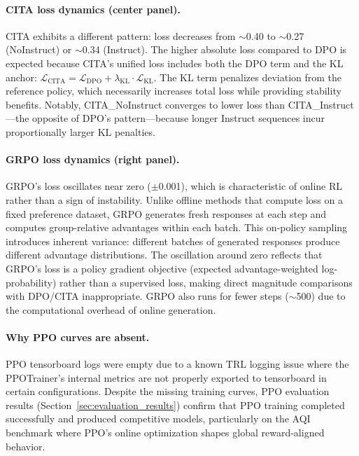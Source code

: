 \paragraph{\textsc{CITA} loss dynamics (center panel).}
\textsc{CITA} exhibits a different pattern: loss decreases from $\sim$0.40 to $\sim$0.27 (NoInstruct) or $\sim$0.34 (Instruct).
The higher absolute loss compared to DPO is expected because \textsc{CITA}'s unified loss includes both the DPO term and the KL anchor: $\mathcal{L}_{\text{CITA}} = \mathcal{L}_{\text{DPO}} + \lambda_{\text{KL}} \cdot \mathcal{L}_{\text{KL}}$.
The KL term penalizes deviation from the reference policy, which necessarily increases total loss while providing stability benefits.
Notably, \textsc{CITA}\_NoInstruct converges to lower loss than \textsc{CITA}\_Instruct---the opposite of DPO's pattern---because longer Instruct sequences incur proportionally larger KL penalties.

\paragraph{GRPO loss dynamics (right panel).}
GRPO's loss oscillates near zero ($\pm$0.001), which is characteristic of online RL rather than a sign of instability.
Unlike offline methods that compute loss on a fixed preference dataset, GRPO generates fresh responses at each step and computes group-relative advantages within each batch.
This on-policy sampling introduces inherent variance: different batches of generated responses produce different advantage distributions.
The oscillation around zero reflects that GRPO's loss is a policy gradient objective (expected advantage-weighted log-probability) rather than a supervised loss, making direct magnitude comparisons with DPO/\textsc{CITA} inappropriate.
GRPO also runs for fewer steps ($\sim$500) due to the computational overhead of online generation.

\paragraph{Why PPO curves are absent.}
PPO tensorboard logs were empty due to a known TRL logging issue where the PPOTrainer's internal metrics are not properly exported to tensorboard in certain configurations.
Despite the missing training curves, PPO evaluation results (Section~\ref{sec:evaluation_results}) confirm that PPO training completed successfully and produced competitive models, particularly on the AQI benchmark where PPO's online optimization shapes global reward-aligned behavior.


